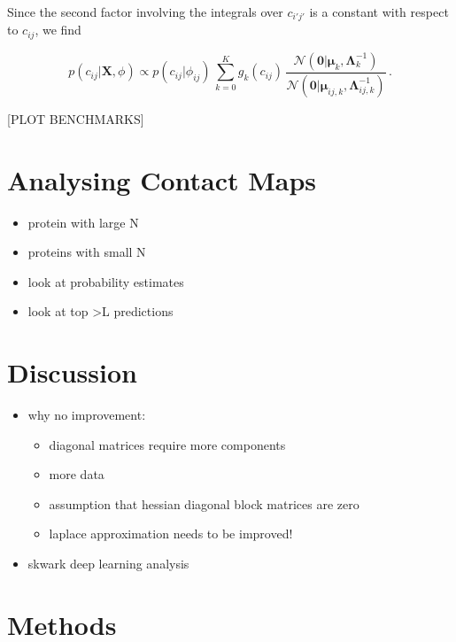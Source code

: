 \documentclass[11pt,a4paper,twoside]{book}
\providecommand{\tightlist}{%
  \setlength{\itemsep}{0pt}\setlength{\parskip}{0pt}}
\newcommand{\Gauss}{\mathcal{N}}
\newcommand{\Lijk}{\mathbf{\Lambda}_{ij,k}}
\newcommand{\Lk}{\mathbf{\Lambda}_k}
\newcommand{\muijk}{\mathbf{\mu}_{ij,k}}
\newcommand{\muk}{\mathbf{\mu}_k}
\newcommand{\cij}{c_{ij}}
\newcommand{\X}{\mathbf{X}}
\theoremstyle{definition}
\theoremstyle{definition}
\theoremstyle{remark}
\begin{document}
Since the second factor involving the integrals over \(c_{i'j'}\) is a
constant with respect to \(\cij\), we find

\begin{equation}
    p(\cij | \X, \phi) \propto  p(\cij |\phi_{ij}) \,  \sum_{k=0}^K g_{k}(\cij) \, \frac{\Gauss( \mathbf{0} | \muk, \Lk^{-1})}{\Gauss(\mathbf{0} | \muijk, \Lijk^{-1})}  \, .
\label{eq:posterior-marginal-rij}
\end{equation}

{[}PLOT BENCHMARKS{]}

\section{Analysing Contact Maps}\label{analysing-contact-maps}

\begin{itemize}
\item
  protein with large N
\item
  proteins with small N
\item
  look at probability estimates
\item
  look at top \textgreater{}L predictions
\end{itemize}

\section{Discussion}\label{discussion-3}

\begin{itemize}
\tightlist
\item
  why no improvement:

  \begin{itemize}
  \tightlist
  \item
    diagonal matrices require more components
  \item
    more data
  \item
    assumption that hessian diagonal block matrices are zero
  \item
    laplace approximation needs to be improved!
  \end{itemize}
\item
  skwark deep learning analysis
\end{itemize}

\newpage

\section{Methods}\label{methods-3}
\end{document}
